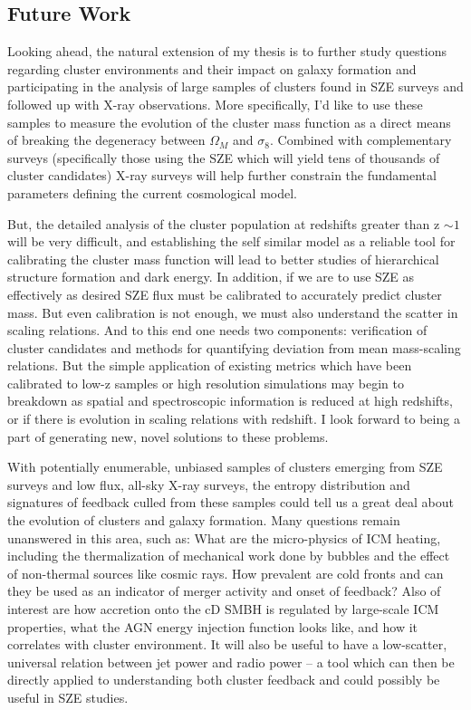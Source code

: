 \documentclass[11pt]{article}
\begin{document}
\subsection*{Future Work}

Looking ahead, the natural extension of my thesis is to further study
questions regarding cluster environments and their impact on galaxy
formation and participating in the analysis of large samples of
clusters found in SZE surveys and followed up with X-ray
observations. More specifically, I'd like to use these samples to 
measure the evolution of the cluster mass function as a direct means
of breaking the degeneracy between $\Omega_M$ and $\sigma_8$. Combined
with complementary surveys (specifically those using the SZE which
will yield tens of thousands of cluster candidates) X-ray surveys will
help further constrain the fundamental parameters defining the current
cosmological model.

But, the detailed analysis of the cluster population at redshifts
greater than z $\sim 1$ will be very difficult, and establishing the
self similar model as a reliable tool for calibrating the cluster mass
function will lead to better studies of hierarchical structure
formation and dark energy. In addition, if we are to use SZE as
effectively as desired SZE flux must be calibrated to accurately predict
cluster mass. But even calibration is not enough, we must also
understand the scatter in scaling relations. And to this end one needs
two components: verification of cluster candidates and methods for
quantifying deviation from mean mass-scaling relations. But the simple
application of existing metrics which have been calibrated to low-z
samples or high resolution simulations may begin to breakdown as
spatial and spectroscopic information is reduced at high redshifts, or
if there is evolution in scaling relations with redshift. I look
forward to being a part of generating new, novel solutions to these
problems.

With potentially enumerable, unbiased samples of clusters emerging
from SZE surveys and low flux, all-sky X-ray surveys, the entropy
distribution and signatures of feedback culled from these samples
could tell us a great deal about the evolution of clusters and galaxy
formation. Many questions remain unanswered in this area, such as:
What are the micro-physics of ICM heating, including the
thermalization of mechanical work done by bubbles and the effect of
non-thermal sources like cosmic rays. How prevalent are cold fronts
and can they be used as an indicator of merger activity and onset of
feedback? Also of interest are how accretion onto the cD SMBH is
regulated by large-scale ICM properties, what the AGN energy injection
function looks like, and how it correlates with cluster
environment. It will also be useful to have a low-scatter, universal
relation between jet power and radio power -- a tool which can then be
directly applied to understanding both cluster feedback and could
possibly be useful in SZE studies.
\end{document}
